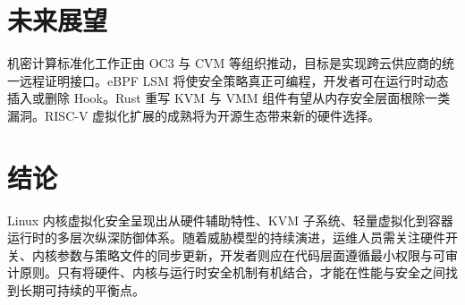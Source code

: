 \chapter{未来展望}
机密计算标准化工作正由 OC3 与 CVM 等组织推动，目标是实现跨云供应商的统一远程证明接口。eBPF LSM 将使安全策略真正可编程，开发者可在运行时动态插入或删除 Hook。Rust 重写 KVM 与 VMM 组件有望从内存安全层面根除一类漏洞。RISC-V 虚拟化扩展的成熟将为开源生态带来新的硬件选择。\par
\chapter{结论}
Linux 内核虚拟化安全呈现出从硬件辅助特性、KVM 子系统、轻量虚拟化到容器运行时的多层次纵深防御体系。随着威胁模型的持续演进，运维人员需关注硬件开关、内核参数与策略文件的同步更新，开发者则应在代码层面遵循最小权限与可审计原则。只有将硬件、内核与运行时安全机制有机结合，才能在性能与安全之间找到长期可持续的平衡点。\par
